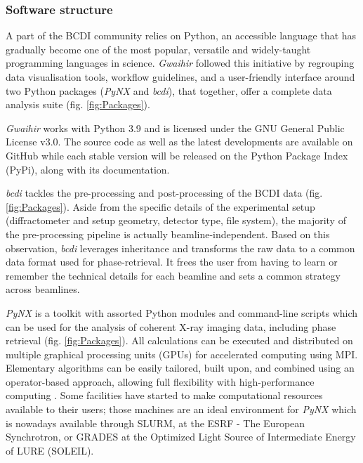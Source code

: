 \subsubsection{Software structure}

A part of the BCDI community relies on Python, an accessible language that has gradually become one of the most popular, versatile \parencite{IPython, Newville2016} and widely-taught \parencite{Scopatz2015, McKinney2017, Boulle2019} programming languages in science.
\textit{Gwaihir} followed this initiative by regrouping data visualisation tools, workflow guidelines, and a user-friendly interface around two Python packages (\textit{PyNX} and \textit{bcdi}), that together, offer a complete data analysis suite (fig. \ref{fig:Packages}).

\textit{Gwaihir} works with Python 3.9 and is licensed under the GNU General Public License v3.0.
The source code as well as the latest developments are available on GitHub while each stable version will be released on the Python Package Index (PyPi), along with its documentation.

\textit{bcdi} \parencite{jerome_carnis_2021_5741935} tackles the pre-processing and post-processing of the BCDI data (fig. \ref{fig:Packages}).
Aside from the specific details of the experimental setup (diffractometer and setup geometry, detector type, file system), the majority of the pre-processing pipeline is actually beamline-independent.
Based on this observation, \textit{bcdi} leverages inheritance and transforms the raw data to a common data format used for phase-retrieval.
It frees the user from having to learn or remember the technical details for each beamline and sets a common strategy across beamlines.

\textit{PyNX} \parencite{pynx2011} is a toolkit with assorted Python modules and command-line scripts which can be used for the analysis of coherent X-ray imaging data, including phase retrieval (fig. \ref{fig:Packages}).
All calculations can be executed and distributed on multiple graphical processing units (GPUs) for accelerated computing using MPI.
Elementary algorithms can be easily tailored, built upon, and combined using an operator-based approach, allowing full flexibility with high-performance computing \parencite{pynx2020operators}.
Some facilities have started to make computational resources available to their users; those machines are an ideal environment for \textit{PyNX} which is nowadays available through SLURM, at the ESRF - The European Synchrotron, or GRADES at the Optimized Light Source of Intermediate Energy of LURE (SOLEIL).

